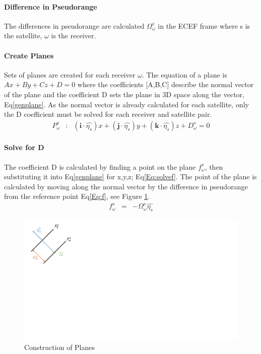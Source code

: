 \paragraph{Difference in Pseudorange}
The differences in pseudorange are calculated $\Omega^s_\omega$ in the ECEF frame where s is the satellite, $\omega$ is the receiver.

\paragraph{Create Planes}
Sets of planes are created for each receiver $\omega$. The equation of a plane is $Ax+By+Cz+D=0$ where the coefficients [A,B,C] describe the normal vector of the plane and the coefficient D sets the plane in 3D space along the vector, Eq\eqref{genplane}. As the normal vector is already calculated for each satellite, only the D coefficient must be solved for each receiver and satellite pair. 
\begin{eqnarray}
P_\omega^s &:& (\textbf{i}\cdot\hat{\eta_s})x + (\textbf{j}\cdot\hat{\eta_s})y + (\textbf{k}\cdot\hat{\eta_s})z + D_\omega^s \label{genplane} = 0
\end{eqnarray}

\paragraph{Solve for D}
The coefficient D is calculated by finding a point on the plane $f_\omega^s$, then substituting it into Eq\eqref{genplane} for x,y,z; Eq\eqref{Eq:solvef}. The point of the plane is calculated by moving along the normal vector by the difference in pseudorange from the reference point Eq\eqref{Eq:f}, see Figure \ref{fig:solvef}.
\begin{eqnarray}
f_\omega^s &=& -\Omega_\omega^s\hat{\eta_s} \label{Eq:f}
\end{eqnarray}

\begin{figure}[t]
\centering
\caption{Construction of Planes}
\label{fig:solvef}
\includegraphics[trim=0 12cm 26cm 0,clip,width =0.6\linewidth]{ChapterPerception/Figures/solveF.pdf}
\end{figure}

